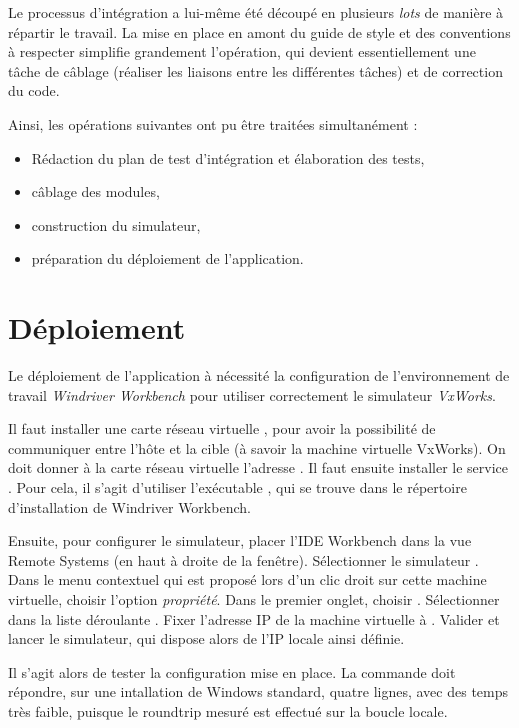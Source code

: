Le processus d'intégration a lui-même été découpé en plusieurs \textit{lots} de
manière à répartir le travail. La mise en place en amont du guide de style et
des conventions à respecter simplifie grandement l'opération, qui devient
essentiellement une tâche de câblage (réaliser les liaisons entre les
différentes tâches) et de correction du code.

Ainsi, les opérations suivantes ont pu être traitées simultanément :

\begin{itemize}
	\item Rédaction du plan de test d'intégration et élaboration des tests,
	\item câblage des modules,
	\item construction du simulateur,
	\item préparation du déploiement de l'application.
\end{itemize}

\section{Déploiement}

Le déploiement de l'application à nécessité la configuration de l'environnement
de travail \textit{Windriver Workbench} pour utiliser correctement le
simulateur \textit{VxWorks}.

Il faut installer une carte réseau virtuelle , pour avoir la possibilité de communiquer entre l'hôte et
la cible (à savoir la machine virtuelle VxWorks). 
On doit donner à la carte réseau virtuelle l'adresse .
Il faut ensuite installer le service . Pour cela, il s'agit
d'utiliser l'exécutable , qui se trouve dans le répertoire
d'installation de Windriver Workbench.

Ensuite, pour configurer le simulateur, placer l'IDE Workbench dans la vue
Remote Systems (en haut à droite de la fenêtre). Sélectionner le simulateur
. Dans le menu contextuel qui est proposé lors d'un clic droit sur
cette machine virtuelle, choisir l'option \emph{propriété}. Dans le premier
onglet, choisir . Sélectionner  dans la
liste déroulante . Fixer l'adresse IP de la machine virtuelle à
. Valider et lancer le simulateur, qui dispose alors de l'IP
locale ainsi définie.

Il s'agit alors de tester la configuration mise en place. La commande  doit répondre, sur une intallation de Windows standard,
quatre lignes, avec des temps très faible, puisque le roundtrip mesuré est effectué
sur la boucle locale.

